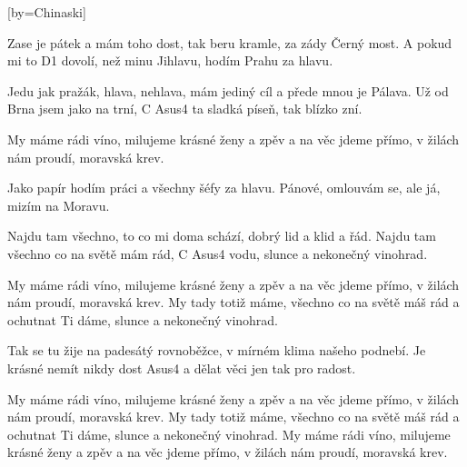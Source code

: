 [by={Chinaski}]

\beginverse{}
Zase je pátek a mám toho dost,
tak beru kramle, za zády Černý most.
A pokud mi to D1 dovolí,
než minu Jihlavu, hodím Prahu za hlavu.
\endverse{}

\beginverse{}
Jedu jak pražák, hlava, nehlava,
mám jediný cíl a přede mnou je Pálava.
Už od Brna jsem jako na trní,
C Asus4
ta sladká píseň, tak blízko zní.
\endverse{}

\beginchorus{}
\lrep{} My máme rádi víno, milujeme krásné ženy a zpěv
a na věc jdeme přímo, v žilách nám proudí, moravská krev. \rrep{}
\endchorus{}

\beginverse{}
Jako papír hodím práci
a všechny šéfy za hlavu.
Pánové, omlouvám se,
ale já, mizím na Moravu.
\endverse{}

\beginverse{}
Najdu tam všechno, to co mi doma schází,
dobrý lid a klid a řád.
Najdu tam všechno co na světě mám rád,
C Asus4
vodu, slunce a nekonečný vinohrad.
\endverse{}

\beginchorus{}
My máme rádi víno, milujeme krásné ženy a zpěv
a na věc jdeme přímo, v žilách nám proudí, moravská krev.
My tady totiž máme, všechno co na světě máš rád
a ochutnat Ti dáme, slunce a nekonečný vinohrad.
\endchorus{}

\beginverse*{}
Tak se tu žije na padesátý rovnoběžce,
v mírném klima našeho podnebí.
Je krásné nemít nikdy dost
Asus4
a dělat věci jen tak pro radost.
\endverse{}

\beginchorus{}
My máme rádi víno, milujeme krásné ženy a zpěv
a na věc jdeme přímo, v žilách nám proudí, moravská krev.
My tady totiž máme, všechno co na světě máš rád
a ochutnat Ti dáme, slunce a nekonečný vinohrad.
My máme rádi víno, milujeme krásné ženy a zpěv
a na věc jdeme přímo, v žilách nám proudí, moravská krev.
\endchorus{}

\endsong{}
